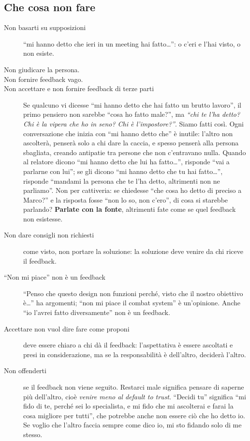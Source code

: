 \subsection{Che cosa non fare}

\begin{description}
  \item[Non basarti su supposizioni] ``mi hanno detto che ieri in un meeting
        hai fatto\dots'': o c'eri e l'hai visto, o non esiste.
  \item[Non giudicare la persona.]
  \item[Non fornire feedback vago.]
  \item[Non accettare e non fornire feedback di terze parti] Se qualcuno vi
        dicesse ``mi hanno detto che hai fatto un brutto lavoro'', il primo
        pensiero non sarebbe ``cosa ho fatto male?'', ma \emph{``chi te l'ha
        detto? Chi è la vipera che ho in seno? Chi è l'impostore?''}. Siamo
        fatti così. Ogni conversazione che inizia con ``mi hanno detto che'' è
        inutile: l'altro non ascolterà, penserà solo a chi dare la caccia, e
        spesso penserà alla persona sbagliata, creando antipatie tra persone
        che non c'entravano nulla. Quando al relatore dicono ``mi hanno detto
        che lui ha fatto\dots'', risponde ``vai a parlarne con lui''; se gli
        dicono ``mi hanno detto che tu hai fatto\dots'', risponde ``mandami la
        persona che te l'ha detto, altrimenti non ne parliamo''. Non per
        cattiveria: se chiedesse ``che cosa ho detto di preciso a Marco?'' e la
        risposta fosse ``non lo so, non c'ero'', di cosa si starebbe parlando?
        \textbf{Parlate con la fonte}, altrimenti fate come se quel feedback non
        esistesse.
  \item[Non dare consigli non richiesti] come visto, non portare la soluzione:
        la soluzione deve venire da chi riceve il feedback.
  \item[``Non mi piace'' non è un feedback] ``Penso che questo design non
        funzioni perché, visto che il nostro obiettivo è\dots'' ha argomenti;
        ``non mi piace il combat system'' è un'opinione. Anche ``io l'avrei
        fatto diversamente'' non è un feedback.
  \item[Accettare non vuol dire fare come proponi] deve essere chiaro a chi dà
        il feedback: l'aspettativa è essere ascoltati e presi in
        considerazione, ma se la responsabilità è dell'altro, deciderà
        l'altro.
  \item[Non offenderti] se il feedback non viene seguito. Restarci male
        significa pensare di saperne più dell'altro, cioè \emph{venire meno al
        default to trust}. ``Decidi tu'' significa ``mi fido di te, perché sei
        lo specialista, e mi fido che mi ascolterai e farai la cosa migliore
        per tutti'', che potrebbe anche non essere ciò che ho detto io. Se
        voglio che l'altro faccia sempre come dico io, mi sto fidando solo di
        me stesso.
\end{description}

